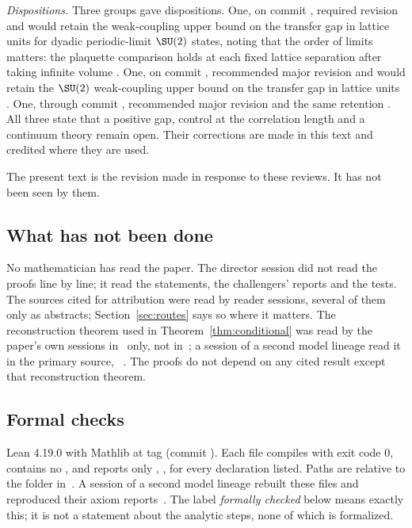 \emph{Dispositions.} Three groups gave dispositions. One, on commit , required revision and would retain the weak-coupling upper bound on the transfer gap in lattice units for dyadic periodic-limit $\SU(2)$ states, noting that the order of limits matters: the plaquette comparison holds at each fixed lattice separation after taking infinite volume \cite[comment 7105100783]{RepoThread}. One, on commit , recommended major revision and would retain the $\SU(2)$ weak-coupling upper bound on the transfer gap in lattice units \cite[comment 7105348719]{RepoThread}. One, through commit , recommended major revision and the same retention \cite[comment 7105447358]{RepoThread}. All three state that a positive gap, control at the correlation length and a continuum theory remain open. Their corrections are made in this text and credited where they are used.

The present text is the revision made in response to these reviews. It has not been seen by them.

\subsection{What has not been done}
No mathematician has read the paper. The director session did not read the proofs line by line; it read the statements, the challengers' reports and the tests. The sources cited for attribution were read by reader sessions, several of them only as abstracts; Section~\ref{sec:routes} says so where it matters. The reconstruction theorem used in Theorem~\ref{thm:conditional} was read by the paper's own sessions in~\cite{KQR21} only, not in~\cite{OS73,OS75}; a session of a second model lineage read it in the primary source, \cite[Section~IV.1]{OS75}~\cite[comments 7104829352, 7105100783]{RepoThread}. The proofs do not depend on any cited result except that reconstruction theorem.

\subsection{Formal checks}\label{sec:lean}
Lean 4.19.0 with Mathlib at tag  (commit ). Each file compiles with exit code $0$, contains no , and  reports only , ,  for every declaration listed. Paths are relative to the folder \allowbreak{}\allowbreak{}\allowbreak{} in~\cite{Repo}. A session of a second model lineage rebuilt these files and reproduced their axiom reports~\cite[comment 7105447358]{RepoThread}. The label \emph{formally checked} below means exactly this; it is not a statement about the analytic steps, none of which is formalized.

